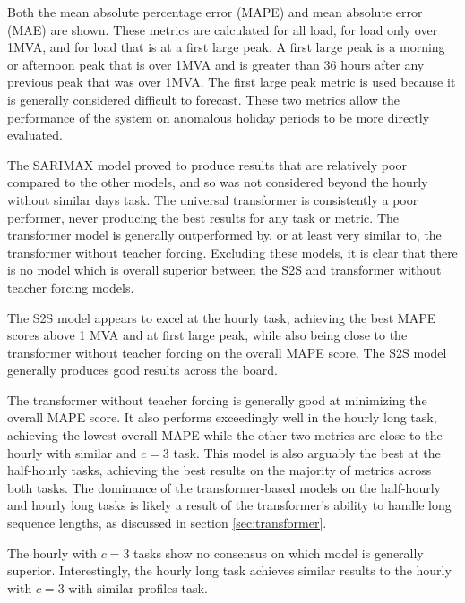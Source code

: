 Both the mean absolute percentage error (MAPE) and mean absolute error (MAE) are shown.
These metrics are calculated for all load, for load only over 1MVA, and for load that is at a first large peak.
A first large peak is a morning or afternoon peak that is over 1MVA and is greater than 36 hours after any previous peak that was over 1MVA.
The first large peak metric is used because it is generally considered difficult to forecast.
These two metrics allow the performance of the system on anomalous holiday periods to be more directly evaluated.

The SARIMAX model proved to produce results that are relatively poor compared to the other models, and so was not considered beyond the hourly without similar days task.
The universal transformer is consistently a poor performer, never producing the best results for any task or metric.
The transformer model is generally outperformed by, or at least very similar to, the transformer without teacher forcing.
Excluding these models, it is clear that there is no model which is overall superior between the S2S and transformer without teacher forcing models.

The S2S model appears to excel at the hourly task, achieving the best MAPE scores above 1 MVA and at first large peak, while also being close to the transformer without teacher forcing on the overall MAPE score.
The S2S model generally produces good results across the board.

The transformer without teacher forcing is generally good at minimizing the overall MAPE score.
It also performs exceedingly well in the hourly long task, achieving the lowest overall MAPE while the other two metrics are close to the hourly with similar and $c=3$ task.
This model is also arguably the best at the half-hourly tasks, achieving the best results on the majority of metrics across both tasks.
The dominance of the transformer-based models on the half-hourly and hourly long tasks is likely a result of the transformer's ability to handle long sequence lengths,
as discussed in section \ref{sec:transformer}.

The hourly with $c=3$ tasks show no consensus on which model is generally superior.
Interestingly, the hourly long task achieves similar results to the hourly with $c=3$ with similar profiles task.

